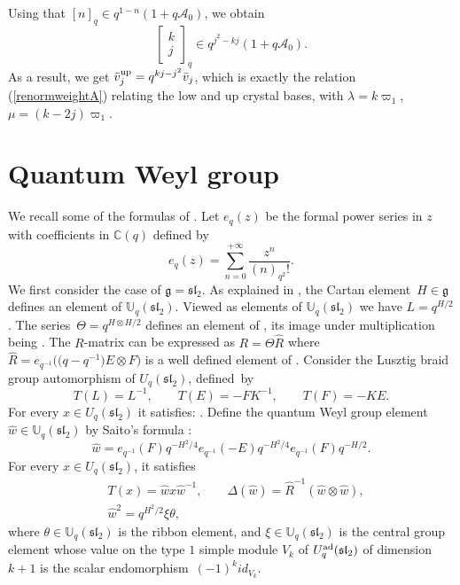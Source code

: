 \documentclass[10pt,a4paper]{amsart}
\numberwithin{equation}{section}
\theoremstyle{definition}
\newcommand{\Aa}{{\mathcal A}}
\begin{document}
Using that $[n]_q\in q^{1-n}(1+q\Aa_0)$, we obtain
\[\left[\begin{matrix} k\\ j \end{matrix}\right]_{q}\in q^{j^2-kj}(1+ q\Aa_0).\]
As a result, we get $\bar{v}_j^{\rm up}=q^{kj-j^2}\bar{v}_j$, which is exactly the relation (\ref{renormweightA}) relating the low and up crystal bases, with $\lambda=k\varpi_1$, $\mu=(k-2j)\varpi_1$.


\section{Quantum Weyl group}\label{QW}
We recall some of the formulas of \cite{BRT}. Let $e_q(z)$ be the formal power series in $z$ with coefficients in $\mathbb{C}(q)$ defined by
\[
e_q(z)=\sum_{n=0}^{+\infty}\frac{z^n}{(n)_{q^2}!}.
\]
We first consider the case of $\mathfrak{g}= {\mathfrak{sl}_2}$. As explained in \cite[Section 3]{BR}, the Cartan element~${H\in \mathfrak{g}}$ defines an element of ${\mathbb U}_q({\mathfrak{sl}_2})$. Viewed as elements of ${\mathbb U}_q(\mathfrak{sl}_2)$ we have $L\!=\!q^{H/2}$. The series~${\Theta=q^{H\otimes H/2}}$ defines an element of , its image under multiplication being . The $R$-matrix can be expressed as
$R=\Theta \hat{R}$ where $\hat{R}=e_{q^{-1}}\big(\big(q-q^{-1}\big) E\otimes F\big)$ is a well defined element of .
Consider the Lusztig \cite{Lusztig2} braid group automorphism of $U_q({\mathfrak{sl}_2})$, defined~by%
\begin{equation}\label{Tdef}
T(L)=L^{-1},\qquad T(E)=- FK^{-1},\qquad T(F)=-KE.
\end{equation}
For every $x \in U_q({\mathfrak{sl}_2})$ it satisfies: .
Define the quantum Weyl group element $\hat{w}\in {\mathbb U}_q({\mathfrak{sl}_2})$ by Saito's formula \cite{Saito}:
\begin{equation}\label{Saitoform}
\hat{w}=e_{q^{-1}}(F)q^{-H^2/4}e_{q^{-1}}(-E)q^{-H^2/4}e_{q^{-1}}(F)q^{-H/2}.
\end{equation}
For every $x \in U_q({\mathfrak{sl}_2})$, it satisfies
\begin{align}%
&T(x) =\hat{w}x\hat{w}^{-1},\qquad
\Delta(\hat{w}) =\hat{R}^{-1}(\hat{w}\otimes\hat{w}),\label{relTw}\\
 &\hat{w}^2 =q^{H^2/2}\xi \theta,\label{wnorm}
\end{align}
where $\theta\in {\mathbb U}_q({\mathfrak{sl}_2})$ is the ribbon element, and $\xi \in {\mathbb U}_q({\mathfrak{sl}_2})$ is the central group element whose value on the type $1$ simple module $V_k$ of $U_q^{\rm ad}({\mathfrak{sl}_2})$ of dimension $k+1$ is the scalar endomorphism~${(-1)^{k} id_{V_k}}$.
\end{document}
